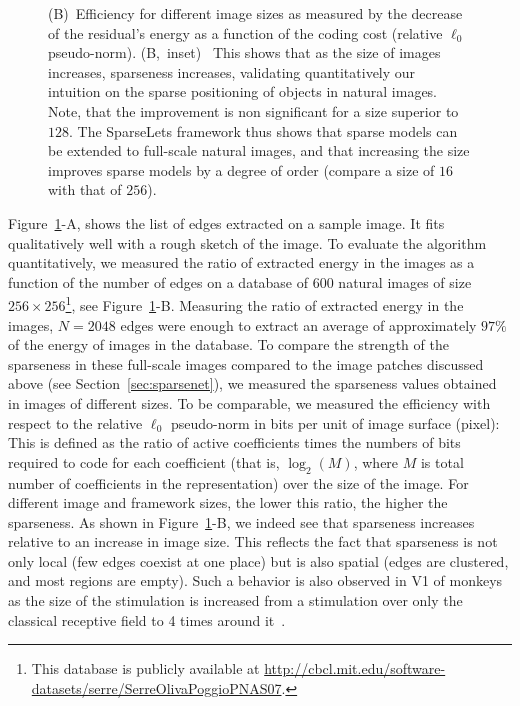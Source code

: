 \documentclass[a4paper, 11pt]{book}
\begin{document}
\begin{figure}[ht!]
{\textsf{(B)}~Efficiency for different image sizes as measured by the decrease of the residual's energy as a function of the coding cost
(relative $\ell_0$ pseudo-norm).
\textsf{(B,~inset)}~%
This shows that as the size of images increases, sparseness increases,
validating quantitatively our intuition on the sparse positioning of objects in natural images.
Note, that the improvement is non significant for a size superior to $128$.
The SparseLets framework thus shows that sparse models can be extended to full-scale natural images, and that increasing the size improves sparse models by a degree of order (compare a size of $16$ with that of $256$).
\label{fig:SparseLets}}%
\end{figure}%

Figure~\ref{fig:SparseLets}-A, shows the list of edges extracted on a sample image. It fits qualitatively well with a rough sketch of the image.
To evaluate the algorithm quantitatively,
we measured the ratio of extracted energy in the images as a function of the number of edges
on a database of 600 natural images  of size $256\times 256$\footnote{This database is publicly available at \url{http://cbcl.mit.edu/software-datasets/serre/SerreOlivaPoggioPNAS07}.}, see Figure~\ref{fig:SparseLets}-B.
Measuring the ratio of extracted energy in the images, $N=2048$ edges were
enough to extract an average of approximately $97\%$ of the energy of images in the database. %
To compare the strength of the sparseness in these full-scale images
compared to the image patches discussed above (see Section~\ref{sec:sparsenet}),
we measured the sparseness values obtained in images of different sizes.
To be comparable, we measured the efficiency with respect to the relative $\ell_0$ pseudo-norm in bits per unit of image surface (pixel):
This is defined as the ratio of active coefficients times the numbers of bits required to code for each coefficient (that is, $\log_2(M)$, where $M$ is total number of coefficients in the representation) over the size of the image. 
For different image and framework sizes, the lower this ratio, the higher the sparseness.
As shown in Figure~\ref{fig:SparseLets}-B,
we indeed see that sparseness increases relative to an increase in image size.
This reflects the fact that sparseness is not only local (few edges coexist at one place)
but is also spatial (edges are clustered, and most regions are empty).
Such a behavior is also observed in V1 of monkeys
as the size of the stimulation is increased from a stimulation over only the classical receptive field
to 4 times around it~\citep{Vinje00}.
\end{document}
